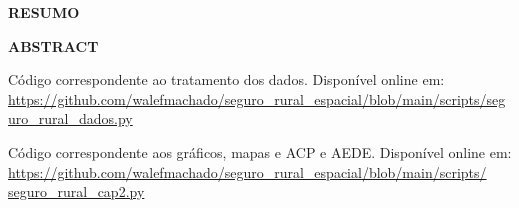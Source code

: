 \documentclass[12pt,a4paper]{article}
\begin{document}

\noindent\textbf{RESUMO} 
\vspace{0.8cm}
\begin{singlespace}
\noindent
\end{singlespace}

\vspace{1cm}
\noindent\textbf{ABSTRACT}
\vspace{0.8cm}
\begin{singlespace}
\noindent   
\end{singlespace}


\newpage



\begin{flushleft}
\renewcommand\refname{}
\vspace*{-0.9cm}
\begin{singlespace}
 
\end{singlespace}
\end{flushleft}


\newpage
{}
\newpage
\begin{singlespace}
\begin{center}
\end{center}
\end{singlespace}
\vspace{0.25cm}
\begin{small}
\linespread{0.86}
\noindent Código correspondente ao tratamento dos dados. Disponível online em: \url{https://github.com/walefmachado/seguro_rural_espacial/blob/main/scripts/seguro_rural_dados.py}

\vspace{0.25cm}

\noindent Código correspondente aos gráficos, mapas e ACP e AEDE. Disponível online em: \url{https://github.com/walefmachado/seguro_rural_espacial/blob/main/scripts/ seguro_rural_cap2.py}
% 
\end{small}
\end{document}
